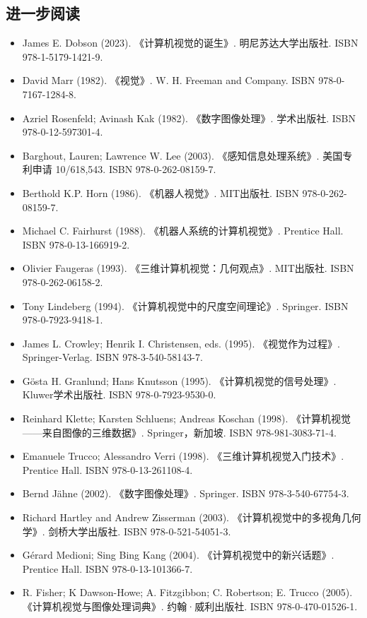 \subsection{进一步阅读 } 
\begin{itemize}
\item James E. Dobson (2023). 《计算机视觉的诞生》. 明尼苏达大学出版社. ISBN 978-1-5179-1421-9.  
\item David Marr (1982). 《视觉》. W. H. Freeman and Company. ISBN 978-0-7167-1284-8.  
\item Azriel Rosenfeld; Avinash Kak (1982). 《数字图像处理》. 学术出版社. ISBN 978-0-12-597301-4.  
\item Barghout, Lauren; Lawrence W. Lee (2003). 《感知信息处理系统》. 美国专利申请 10/618,543. ISBN 978-0-262-08159-7.  
\item Berthold K.P. Horn (1986). 《机器人视觉》. MIT出版社. ISBN 978-0-262-08159-7.  
\item Michael C. Fairhurst (1988). 《机器人系统的计算机视觉》. Prentice Hall. ISBN 978-0-13-166919-2.  
\item Olivier Faugeras (1993). 《三维计算机视觉：几何观点》. MIT出版社. ISBN 978-0-262-06158-2.  
\item Tony Lindeberg (1994). 《计算机视觉中的尺度空间理论》. Springer. ISBN 978-0-7923-9418-1.  
\item James L. Crowley; Henrik I. Christensen, eds. (1995). 《视觉作为过程》. Springer-Verlag. ISBN 978-3-540-58143-7.  
\item Gösta H. Granlund; Hans Knutsson (1995). 《计算机视觉的信号处理》. Kluwer学术出版社. ISBN 978-0-7923-9530-0.  
\item Reinhard Klette; Karsten Schluens; Andreas Koschan (1998). 《计算机视觉——来自图像的三维数据》. Springer，新加坡. ISBN 978-981-3083-71-4.  
\item Emanuele Trucco; Alessandro Verri (1998). 《三维计算机视觉入门技术》. Prentice Hall. ISBN 978-0-13-261108-4.  
\item Bernd Jähne (2002). 《数字图像处理》. Springer. ISBN 978-3-540-67754-3.  
\item Richard Hartley and Andrew Zisserman (2003). 《计算机视觉中的多视角几何学》. 剑桥大学出版社. ISBN 978-0-521-54051-3.  
\item Gérard Medioni; Sing Bing Kang (2004). 《计算机视觉中的新兴话题》. Prentice Hall. ISBN 978-0-13-101366-7.  
\item R. Fisher; K Dawson-Howe; A. Fitzgibbon; C. Robertson; E. Trucco (2005). 《计算机视觉与图像处理词典》. 约翰·威利出版社. ISBN 978-0-470-01526-1.  

\end{itemize}
